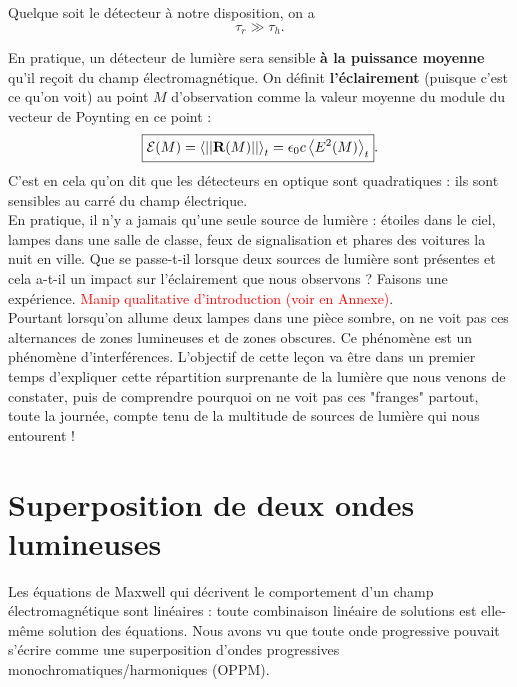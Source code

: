 \documentclass[11pt,a4paper]{report}
\begin{document}
Quelque soit le détecteur à notre disposition, on a
\begin{equation}
	\boxed{\tau_r \gg \tau_h}.
\end{equation}

En pratique, un détecteur de lumière sera sensible \textbf{à la puissance moyenne} qu'il reçoit du champ électromagnétique. On définit \textbf{l'éclairement} (puisque c'est ce qu'on voit) au point $M$ d'observation comme la valeur moyenne du module du vecteur de Poynting en ce point :
\begin{equation}
	\boxed{\mathcal{E}(M) = \left\langle ||\bold{R}(M)|| \right\rangle _t
	= \epsilon_0 c \left\langle E^2(M) \right\rangle_t}. 
\end{equation} 
C'est en cela qu'on dit que les détecteurs en optique sont quadratiques : ils sont sensibles au carré du champ électrique.\\

En pratique, il n'y a jamais qu'une seule source de lumière : étoiles dans le ciel, lampes dans une salle de classe, feux de signalisation et phares des voitures la nuit en ville. Que se passe-t-il lorsque deux sources de lumière sont présentes et cela a-t-il un impact sur l'éclairement que nous observons ? Faisons une expérience. \textcolor{red}{Manip qualitative d'introduction (voir en Annexe)}.\\ 

Pourtant lorsqu'on allume deux lampes dans une pièce sombre, on ne voit pas ces alternances de zones lumineuses et de zones obscures. Ce phénomène est un phénomène d'interférences. L'objectif de cette leçon va être dans un premier temps d'expliquer cette répartition surprenante de la lumière que nous venons de constater, puis de comprendre pourquoi on ne voit pas ces "franges" partout, toute la journée, compte tenu de la multitude de sources de lumière qui nous entourent !

\newpage
\section{Superposition de deux ondes lumineuses}

Les équations de Maxwell qui décrivent le comportement d'un champ électromagnétique sont linéaires : toute combinaison linéaire de solutions est elle-même solution des équations. Nous avons vu que toute onde progressive pouvait s'écrire comme une superposition d'ondes progressives monochromatiques/harmoniques (OPPM).\\
\end{document}
